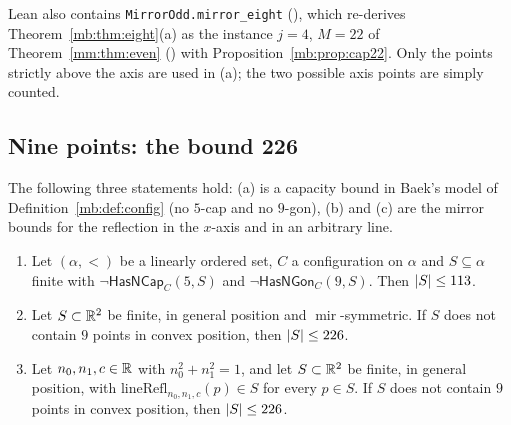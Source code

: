 \begin{remark}\label{mb:rem:eight}
Lean also contains \texttt{MirrorOdd.}\allowbreak\texttt{mirror\_eight\textquotesingle}
(), which re-derives Theorem~\ref{mb:thm:eight}(a) as the instance $j=4$,
$M=22$ of Theorem~\ref{mm:thm:even} () with Proposition~\ref{mb:prop:cap22}.
Only the points strictly above the axis are used in (a); the two possible axis points are simply counted.
\end{remark}

\subsection{Nine points: the bound 226}\label{mb:ssec:nine}

\begin{theorem}\label{mb:thm:nine}\raggedright
The following three statements hold: (a) is a capacity bound in Baek's model of Definition~\ref{mb:def:config} (no
$5$-cap and no $9$-gon), (b) and (c) are the mirror bounds for the reflection in the $x$-axis and in an arbitrary line.
\begin{enumerate}[label=(\alph*)]
\item Let $(\alpha,<)$ be a linearly ordered set, $C$ a configuration on $\alpha$ and $S\subseteq\alpha$ finite with
  $\neg\mathsf{HasNCap}_C(5,S)$ and $\neg\mathsf{HasNGon}_C(9,S)$. Then $\lvert S\rvert\le113$.
\item Let $S\subset\mathbb R^2$ be finite, in general position and $\operatorname{mir}$-symmetric. If $S$ does not contain $9$
  points in convex position, then $\lvert S\rvert\le226$.
\item Let $n_0,n_1,c\in\mathbb R$ with $n_0^2+n_1^2=1$, and let $S\subset\mathbb R^2$ be finite, in general position, with
  $\mathrm{lineRefl}_{n_0,n_1,c}(p)\in S$ for every $p\in S$. If $S$ does not contain $9$ points in convex position, then
  $\lvert S\rvert\le226$.
\end{enumerate}
\end{theorem}

